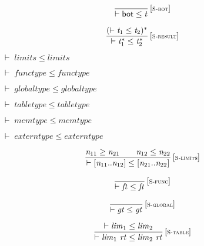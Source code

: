 $$
\begin{array}{@{}c@{}}\displaystyle
\frac{
}{
{ \vdash }\;\mathsf{bot} \leq {\mathit{t}}
} \, {[\textsc{\scriptsize S{-}bot}]}
\qquad
\end{array}
$$

$$
\begin{array}{@{}c@{}}\displaystyle
\frac{
({ \vdash }\;{\mathit{t}}_{{1}} \leq {\mathit{t}}_{{2}})^\ast
}{
{ \vdash }\;{{\mathit{t}}_{{1}}^\ast} \leq {{\mathit{t}}_{{2}}^\ast}
} \, {[\textsc{\scriptsize S{-}result}]}
\qquad
\end{array}
$$

\vspace{1ex}

$\boxed{{ \vdash }\;{\mathit{limits}} \leq {\mathit{limits}}}$

$\boxed{{ \vdash }\;{\mathit{functype}} \leq {\mathit{functype}}}$

$\boxed{{ \vdash }\;{\mathit{globaltype}} \leq {\mathit{globaltype}}}$

$\boxed{{ \vdash }\;{\mathit{tabletype}} \leq {\mathit{tabletype}}}$

$\boxed{{ \vdash }\;{\mathit{memtype}} \leq {\mathit{memtype}}}$

$\boxed{{ \vdash }\;{\mathit{externtype}} \leq {\mathit{externtype}}}$

\vspace{1ex}

$$
\begin{array}{@{}c@{}}\displaystyle
\frac{
{\mathit{n}}_{{11}} \geq {\mathit{n}}_{{21}}
 \qquad
{\mathit{n}}_{{12}} \leq {\mathit{n}}_{{22}}
}{
{ \vdash }\;{}[{\mathit{n}}_{{11}} .. {\mathit{n}}_{{12}}] \leq {}[{\mathit{n}}_{{21}} .. {\mathit{n}}_{{22}}]
} \, {[\textsc{\scriptsize S{-}limits}]}
\qquad
\end{array}
$$

$$
\begin{array}{@{}c@{}}\displaystyle
\frac{
}{
{ \vdash }\;{\mathit{ft}} \leq {\mathit{ft}}
} \, {[\textsc{\scriptsize S{-}func}]}
\qquad
\end{array}
$$

$$
\begin{array}{@{}c@{}}\displaystyle
\frac{
}{
{ \vdash }\;{\mathit{gt}} \leq {\mathit{gt}}
} \, {[\textsc{\scriptsize S{-}global}]}
\qquad
\end{array}
$$

$$
\begin{array}{@{}c@{}}\displaystyle
\frac{
{ \vdash }\;{\mathit{lim}}_{{1}} \leq {\mathit{lim}}_{{2}}
}{
{ \vdash }\;{\mathit{lim}}_{{1}}~{\mathit{rt}} \leq {\mathit{lim}}_{{2}}~{\mathit{rt}}
} \, {[\textsc{\scriptsize S{-}table}]}
\qquad
\end{array}
$$

